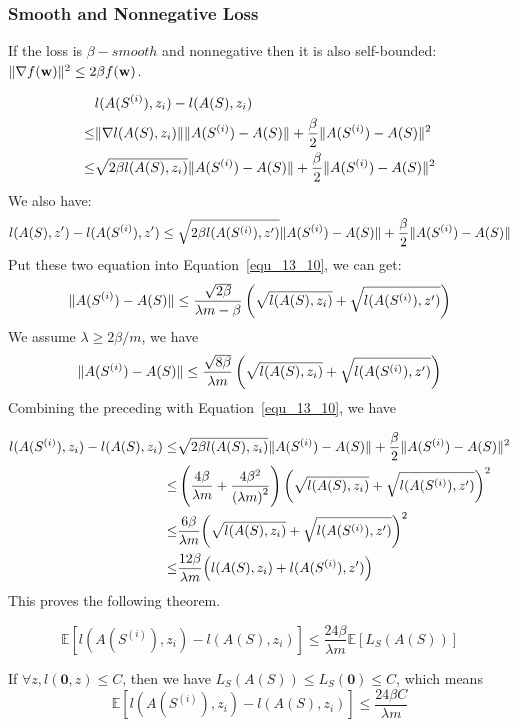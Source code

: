\subsubsection{Smooth and Nonnegative Loss}

If the loss is $ \beta-smooth $ and nonnegative then it is also self-bounded:
$ \Arrowvert \nabla f(\mathbf{w}) \Arrowvert^2 \le 2 \beta f(\mathbf{w}) $.

\begin{equation}
	\label{equ_13_10}
	\begin{aligned}
		& l( A(S^{(i)}), z_i) - l( A(S), z_i) \\
		\le & \Arrowvert \nabla l ( A(S), z_i) \Arrowvert \Arrowvert A(S^{(i)}) - A(S) \Arrowvert
		+ \frac{\beta}{2} \Arrowvert A(S^{(i)}) - A(S) \Arrowvert^2 \\
		\le & \sqrt{2\beta l(A(S), z_i)} \Arrowvert A(S^{(i)}) - A(S) \Arrowvert
		+ \frac{\beta}{2} \Arrowvert A(S^{(i)}) - A(S) \Arrowvert^2
	\end{aligned}
\end{equation}
We also have:
\begin{equation}
	l( A(S), z') - l( A(S^{(i)}), z')
	\le \sqrt{2\beta l( A( S^{(i)} ), z')}	\Arrowvert A(S^{(i)}) - A(S) \Arrowvert
	+\frac{\beta}{2} \Arrowvert A(S^{(i)}) - A(S) \Arrowvert
\end{equation}
Put these two equation into Equation~\ref{equ_13_10}, we can get:
\[ 
	\Arrowvert A(S^{(i)}) - A(S) \Arrowvert \le
	\frac{\sqrt{2\beta}}{\lambda m - \beta}
	\left( \sqrt{l(A(S), z_i)} + \sqrt{l(A(S^{(i)}), z')}\right)
\]
We assume $ \lambda \ge 2\beta/m $, we have
\[ 
	\Arrowvert A(S^{(i)}) - A(S) \Arrowvert \le
	\frac{\sqrt{8\beta}}{\lambda m}
	\left( \sqrt{l(A(S), z_i)} + \sqrt{l(A(S^{(i)}), z')}\right)
\]
Combining the preceding with Equation~\ref{equ_13_10}, we have

\begin{equation}
	\begin{aligned}
		l(A(S^{(i)}), z_i) - l(A(S), z_i)
		\le & \sqrt{2\beta l(A(S), z_i)} \Arrowvert A(S^{(i)}) - A(S) \Arrowvert 
		+ \frac{\beta}{2} \Arrowvert A(S^{(i)}) - A(S) \Arrowvert^2 \\
		\le & \left( \frac{4\beta}{\lambda m} + \frac{4\beta^2}{{(\lambda m)}^2} \right)
		{\left( \sqrt{l(A(S), z_i)} + \sqrt{l(A(S^{(i)}), z')} \right)}^2 \\
		\le & \frac{6\beta}{\lambda m}
		{\left( \sqrt{l(A(S), z_i)} + \sqrt{l(A(S^{(i)}), z')} \right)}^2 \\
		\le & \frac{12\beta}{\lambda m}
		{\left( {l(A(S), z_i)} + {l(A(S^{(i)}), z')} \right)}
	\end{aligned}
\end{equation}
This proves the following theorem.
\begin{thm}
	\begin{equation}
		\mathbb{E} [l(A(S^{(i)}), z_i) - l(A(S), z_i)] \le
		\frac{24\beta}{\lambda m} \mathbb{E}[L_S(A(S))]
	\end{equation}
\end{thm}
If $\forall z, l(\mathbf{0}, z) \le C $, then we have
$ L_S(A(S)) \le  L_S(\mathbf{0}) \le C $, which means
\[ 
	\mathbb{E} [l(A(S^{(i)}), z_i) - l(A(S), z_i)] \le \frac{24\beta C}{\lambda m}
\]

